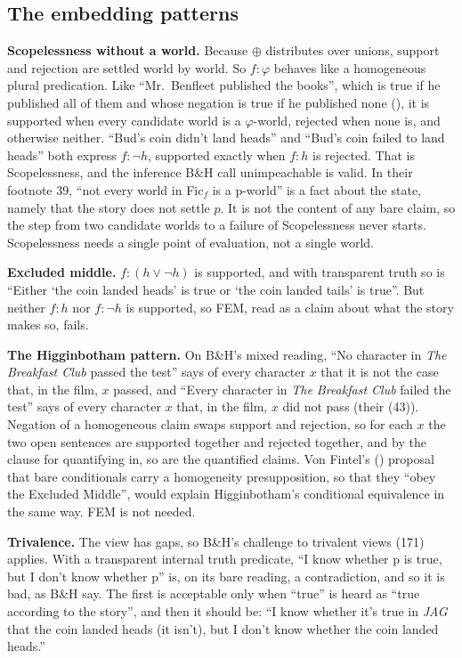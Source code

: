 \documentclass[
  11pt,
  letterpaper,
  DIV=11,
  numbers=noendperiod,
  twoside]{scrartcl}
\newcounter{none} %
\begin{document}
\subsection{The embedding patterns}\label{the-embedding-patterns}

\textbf{Scopelessness without a world.} Because \(\oplus\) distributes
over unions, support and rejection are settled world by world. So
\(f{:}\varphi\) behaves like a homogeneous plural predication. Like
``Mr.~Benfleet published the books'', which is true if he published all
of them and whose negation is true if he published none
(), it is supported when every
candidate world is a \(\varphi\)-world, rejected when none is, and
otherwise neither. ``Bud's coin didn't land heads'' and ``Bud's coin
failed to land heads'' both express \(f{:}\neg h\), supported exactly
when \(f{:}h\) is rejected. That is Scopelessness, and the inference
B\&H call unimpeachable is valid. In their footnote 39, ``not every
world in Fic\(_f\) is a p-world'' is a fact about the state, namely that
the story does not settle \(p\). It is not the content of any bare
claim, so the step from two candidate worlds to a failure of
Scopelessness never starts. Scopelessness needs a single point of
evaluation, not a single world.

\textbf{Excluded middle.} \(f{:}(h \vee \neg h)\) is supported, and with
transparent truth so is ``Either `the coin landed heads' is true or `the
coin landed tails' is true''. But neither \(f{:}h\) nor \(f{:}\neg h\)
is supported, so FEM, read as a claim about what the story makes so,
fails.

\textbf{The Higginbotham pattern.} On B\&H's mixed reading, ``No
character in \emph{The Breakfast Club} passed the test'' says of every
character \(x\) that it is not the case that, in the film, \(x\) passed,
and ``Every character in \emph{The Breakfast Club} failed the test''
says of every character \(x\) that, in the film, \(x\) did not pass
(their (43)). Negation of a homogeneous claim swaps support and
rejection, so for each \(x\) the two open sentences are supported
together and rejected together, and by the clause for quantifying in, so
are the quantified claims. Von Fintel's
() proposal that bare conditionals
carry a homogeneity presupposition, so that they ``obey the Excluded
Middle'', would explain Higginbotham's conditional equivalence in the
same way. FEM is not needed.

\textbf{Trivalence.} The view has gaps, so B\&H's challenge to trivalent
views (171) applies. With a transparent internal truth predicate, ``I
know whether p is true, but I don't know whether p'' is, on its bare
reading, a contradiction, and so it is bad, as B\&H say. The first is
acceptable only when ``true'' is heard as ``true according to the
story'', and then it should be: ``I know whether it's true in \emph{JAG}
that the coin landed heads (it isn't), but I don't know whether the coin
landed heads.''
\end{document}
